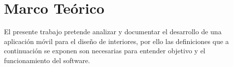 \chapter{Marco Teórico } %
	El presente trabajo pretende analizar y documentar el desarrollo de una aplicación móvil para el diseño de interiores, por ello las definiciones que a continuación se exponen son necesarias para entender objetivo y el funcionamiento del software.
	
